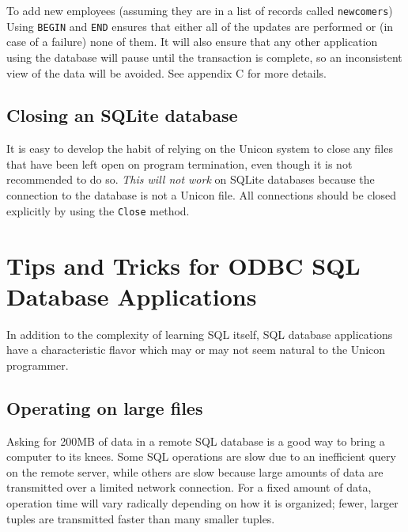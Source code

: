 To add new employees (assuming they are in a list of records called
\texttt{newcomers})
\noindent
Using \texttt{BEGIN} and \texttt{END} ensures that either all of the
updates are performed or (in case of a failure) none of them. It will also
ensure that any other application using the database will pause until the
transaction is complete, so an inconsistent view of the data will be
avoided.  See appendix C for more details.

\subsection*{Closing an SQLite database}
It is easy to develop the habit of relying on the Unicon system to close
any files that have been left open on program termination, even though it
is not recommended to do so. {\em This will not work\/} on SQLite
databases because the connection to the database is not a Unicon
file. All connections should be closed explicitly by using the
\texttt{Close} method.

\section{Tips and Tricks for ODBC SQL Database Applications}

In addition to the complexity of learning SQL itself, SQL database
applications have a characteristic flavor which may or may not seem
natural to the Unicon programmer.

\subsection*{Operating on large files}

Asking for 200MB of data in a remote SQL database is a good way to
bring a computer to its knees. Some SQL operations are slow due to an
inefficient query on the remote server, while others are slow because
large amounts of data are transmitted over a limited network
connection. For a fixed amount of data, operation time will vary
radically depending on how it is organized; fewer, larger tuples are
transmitted faster than many smaller tuples.

